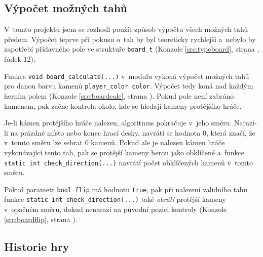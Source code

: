 \subsection{Výpočet možných tahů}

V~tomto projektu jsem se rozhodl použít způsob výpočtu všech možných tahů předem. Výpočet teprve při pokusu o~tah by byl teoreticky rychlejší a~nebylo by zapotřebí přídavného pole ve struktuře \lstinline{board_t} (Konzole \ref{src:typeboard}, strana \pageref{src:typeboard}, řádek 12).



Funkce \lstinline[style=source]{void board_calculate(...)} v~modulu  vykoná výpočet možných tahů pro danou barvu kamenů \lstinline[style=source]{player_color color}. Výpočet tedy koná nad každým herním polem (Konzole \ref{src:boardcalc}, strana \pageref{src:boardcalc}). Pokud pole není zabráno kamenem, pak začne kontrola okolo, kde se hledají kameny protějšího hráče.



Je-li kámen protějšího hráče nalezen, algoritmus pokračuje v~jeho směru. Narazí-li na prázdné místo nebo konec hrací desky, navrátí se hodnota $0$, která značí, že v~tomto směru lze sebrat $0$ kamenů. Pokud ale je nalezen kámen hráče vykonávající tento tah, pak se protější kameny berou jako obklíčené a~funkce \lstinline[style=source]{static int check_direction(...)} navrátí počet obklíčených kamenů v~tomto směru.

Pokud parametr \lstinline[style=source]{bool flip} má hodnotu \lstinline{true}, pak při nalezení validního tahu funkce \lstinline[style=source]{static int check_direction(...)} také \emph{obrátí} protější kameny v~opačném směru, dokud nenarazí na původní pozici kontroly (Konzole \ref{src:boardflip}, strana \pageref{src:boardflip}).



\subsection{Historie hry}

